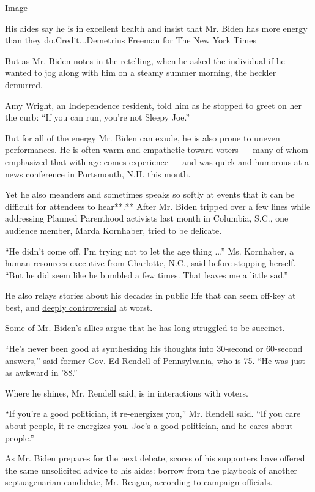 Image

His aides say he is in excellent health and insist that Mr. Biden has
more energy than they do.Credit...Demetrius Freeman for The New York
Times

But as Mr. Biden notes in the retelling, when he asked the individual if
he wanted to jog along with him on a steamy summer morning, the heckler
demurred.

Amy Wright, an Independence resident, told him as he stopped to greet on
her the curb: ``If you can run, you're not Sleepy Joe.''

But for all of the energy Mr. Biden can exude, he is also prone to
uneven performances. He is often warm and empathetic toward voters ---
many of whom emphasized that with age comes experience --- and was quick
and humorous at a news conference in Portsmouth, N.H. this month.

Yet he also meanders and sometimes speaks so softly at events that it
can be difficult for attendees to hear**.** After Mr. Biden tripped over
a few lines while addressing Planned Parenthood activists last month in
Columbia, S.C., one audience member, Marda Kornhaber, tried to be
delicate.

``He didn't come off, I'm trying not to let the age thing ...'' Ms.
Kornhaber, a human resources executive from Charlotte, N.C., said before
stopping herself. ``But he did seem like he bumbled a few times. That
leaves me a little sad.''

He also relays stories about his decades in public life that can seem
off-key at best, and
\href{https://www.nytimes.com/2019/06/19/us/politics/biden-segregationists.html}{deeply
controversial} at worst.

Some of Mr. Biden's allies argue that he has long struggled to be
succinct.

``He's never been good at synthesizing his thoughts into 30-second or
60-second answers,'' said former Gov. Ed Rendell of Pennsylvania, who is
75. ``He was just as awkward in '88.''

Where he shines, Mr. Rendell said, is in interactions with voters.

``If you're a good politician, it re-energizes you,'' Mr. Rendell said.
``If you care about people, it re-energizes you. Joe's a good
politician, and he cares about people.''

As Mr. Biden prepares for the next debate, scores of his supporters have
offered the same unsolicited advice to his aides: borrow from the
playbook of another septuagenarian candidate, Mr. Reagan, according to
campaign officials.

